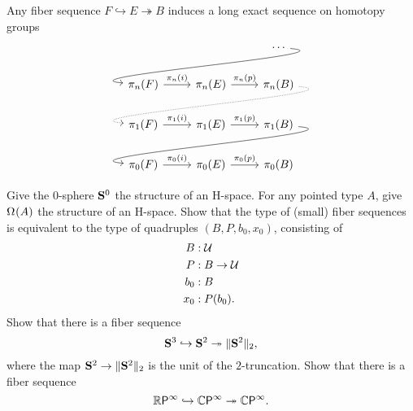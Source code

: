 \begin{thm}
Any fiber sequence $F\hookrightarrow E\twoheadrightarrow B$ induces a long exact sequence on homotopy groups
\begin{equation*}
\begin{tikzcd}
& & \cdots \arrow[out=355,in=175,dll] \\
\pi_n(F) \arrow[r,"\pi_n(i)"] & \pi_n(E) \arrow[r,"\pi_n(p)"] & \pi_n(B) \arrow[out=355,in=175,dll,densely dotted] \\
\pi_1(F) \arrow[r,"\pi_1(i)"] & \pi_1(E) \arrow[r,"\pi_1(p)"] & \pi_1(B) \arrow[out=355,in=175,dll] \\
\pi_0(F) \arrow[r,"\pi_0(i)"] & \pi_0(E) \arrow[r,"\pi_0(p)"] & \pi_0(B)
\end{tikzcd}
\end{equation*}
\end{thm}


\begin{exercises}
\exercise Give the $0$-sphere $\mathbf{S}^{0}$ the structure of an H-space.
\exercise For any pointed type $A$, give $\Omega^{}(A)$ the structure of an H-space.
\exercise Show that the type of (small) fiber sequences is equivalent to the type of quadruples $(B,P,b_0,x_0)$, consisting of
\begin{align*}
B & : \mathcal{U} \\
P & : B \to \mathcal{U} \\
b_0 & : B \\
x_0 & : P(b_0).
\end{align*}
\exercise Show that there is a fiber sequence
\begin{equation*}
  \mathbf{S}^{3}\hookrightarrow\mathbf{S}^{2}\twoheadrightarrow\Vert \mathbf{S}^{2}\Vert_{2},
\end{equation*}
where the map $\mathbf{S}^{2}\to\Vert \mathbf{S}^{2}\Vert_{2}$ is the unit of the $2$-truncation.
\exercise Show that there is a fiber sequence
\begin{equation*}
  \mathbb{R}\mathsf{P}^{\infty}\hookrightarrow\mathbb{C}\mathsf{P}^{\infty}\twoheadrightarrow\mathbb{C}\mathsf{P}^{\infty}.
\end{equation*}
\end{exercises}
